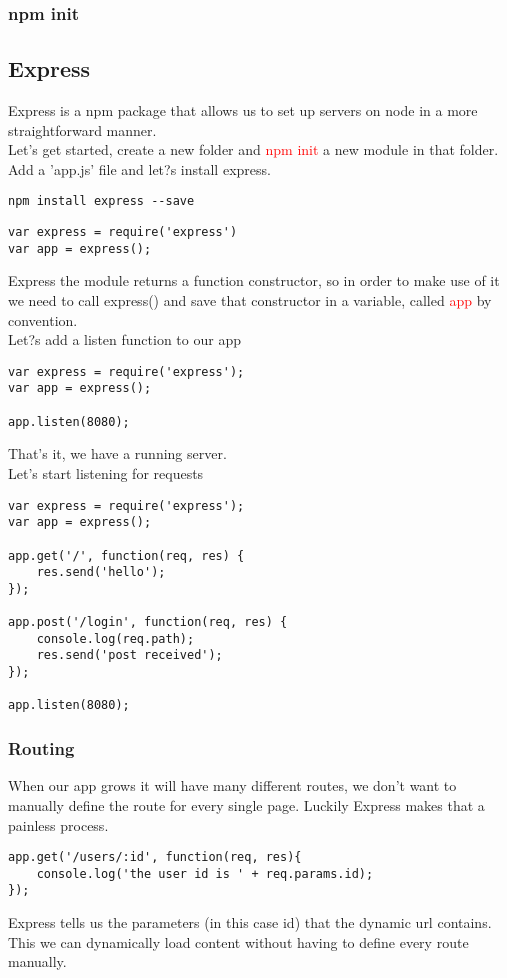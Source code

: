 \documentclass[a4paper]{article}
\begin{document}
\subsubsection{npm init}


\subsection{Express}
Express is a npm package that allows us to set up servers on node in a more straightforward manner.\\

Let's get started, create a new folder and \textcolor{red}{npm init} a new module in that folder. Add a 'app.js' file and let?s install express.
\begin{lstlisting}
npm install express --save
\end{lstlisting}
\begin{lstlisting}
var express = require('express')
var app = express();
\end{lstlisting}
Express the module returns a function constructor, so in order to make use of it we need to call express() and save that constructor in a variable, called \textcolor{red}{app} by convention.
\\
Let?s add a listen function to our app
\begin{lstlisting}
var express = require('express');
var app = express();

app.listen(8080);
\end{lstlisting}
That's it, we have a running server.\\
Let's start listening for requests
\begin{lstlisting}
var express = require('express');
var app = express();

app.get('/', function(req, res) {
    res.send('hello');
});

app.post('/login', function(req, res) {
    console.log(req.path);
    res.send('post received');
});

app.listen(8080);
\end{lstlisting} 

\subsubsection{Routing}
When our app grows it will have many different routes, we don't want to manually define the route for every single page. Luckily Express makes that a painless process.
\begin{lstlisting}
app.get('/users/:id', function(req, res){
    console.log('the user id is ' + req.params.id);
});
\end{lstlisting}
Express tells us the parameters (in this case id) that the dynamic url contains. This we can dynamically load content without having to define every route manually.
\end{document}
